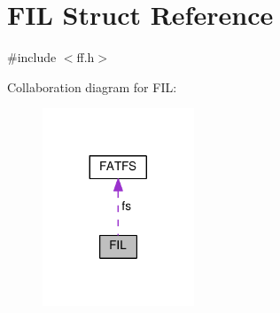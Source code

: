 \hypertarget{structFIL}{}\section{F\+IL Struct Reference}
\label{structFIL}


{\ttfamily \#include $<$ff.\+h$>$}



Collaboration diagram for F\+IL\+:\nopagebreak
\begin{figure}[H]
\begin{center}
\leavevmode
\includegraphics[width=128pt]{d1/dae/structFIL__coll__graph}
\end{center}
\end{figure}
